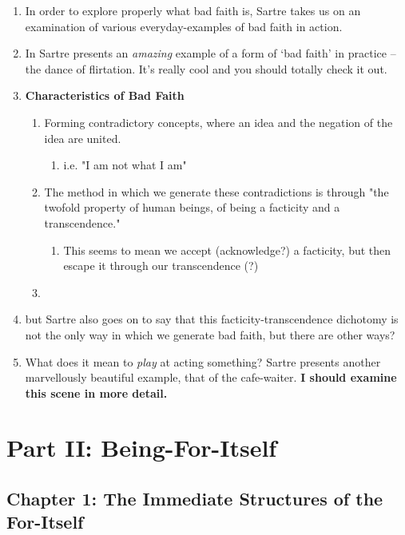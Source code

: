 \begin{enumerate}
  \item In order to explore properly what bad faith is, Sartre takes us on an examination of various everyday-examples of bad faith in action.
  \item In \autocite[98]{sartre} Sartre presents an \emph{amazing} example of a form of `bad faith' in practice -- the dance of flirtation. It's really cool and you should totally check it out.
  \item \textbf{Characteristics of Bad Faith}
  \begin{enumerate}
    \item Forming contradictory concepts, where an idea and the negation of the idea are united.
    \begin{enumerate}
      \item i.e. "I am not what I am"
    \end{enumerate}
    \item The method in which we generate these contradictions is through "the twofold property of human beings, of being a facticity and a transcendence." \autocite[99]{sartre}
    \begin{enumerate}
      \item This seems to mean we accept (acknowledge?) a facticity, but then escape it through our transcendence (?)
    \end{enumerate}
    \item
  \end{enumerate}
  \item but Sartre also goes on to say that this facticity-transcendence dichotomy is not the only way in which we generate bad faith, but there are other ways?
  \item \autocite[102]{sartre} What does it mean to \emph{play} at acting something? Sartre presents another marvellously beautiful example, that of the cafe-waiter. \textbf{I should examine this scene in more detail.}
\end{enumerate}

\section{Part II: Being-For-Itself}

\subsection{Chapter 1: The Immediate Structures of the For-Itself}


